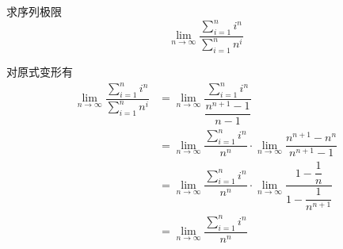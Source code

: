 \documentclass{ctexart}
\begin{document}
\pagestyle{empty}
\begin{problem}[例2.]
    求序列极限$$\lim_{n\to\infty}{\dfrac{\sum_{i=1}^n{i^n}}{\sum_{i=1}^n{n^i}}}$$
\end{problem}
\begin{solution}[Solution.]
    对原式变形有
    \begin{align*}
        \lim_{n\to\infty}{\dfrac{\sum_{i=1}^n{i^n}}{\sum_{i=1}^n{n^i}}}
        &= \lim_{n\to\infty}{\dfrac{\sum_{i=1}^n{i^n}}{\dfrac{n^{n+1}-1}{n-1}}} \\
        &= \lim_{n\to\infty}{\dfrac{\sum_{i=1}^n{i^n}}{n^n}}\cdot\lim_{n\to\infty}{\dfrac{n^{n+1}-n^n}{n^{n+1}-1}} \\
        &= \lim_{n\to\infty}{\dfrac{\sum_{i=1}^n{i^n}}{n^n}}\cdot\lim_{n\to\infty}{\dfrac{1-\dfrac{1}{n}}{1-\dfrac{1}{n^{n+1}}}} \\
        &= \lim_{n\to\infty}{\dfrac{\sum_{i=1}^n{i^n}}{n^n}}
    \end{align*}
\end{solution}
\end{document}

